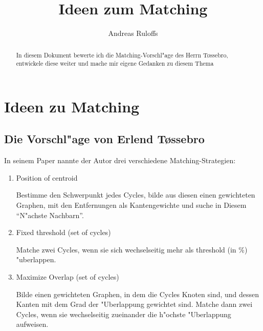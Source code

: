 \documentclass[a4paper,11pt]{scrreprt}
\title{Ideen zum Matching}
\author{Andreas Ruloffs}
\begin{document}
\maketitle

\begin{abstract}
In diesem Dokument bewerte ich die Matching-Vorschl"age des Herrn T\o{}ssebro, entwickele diese weiter und mache mir eigene Gedanken zu diesem Thema
\end{abstract}
\tableofcontents
\chapter{Ideen zu Matching}

\section{Die Vorschl"age von Erlend T\o{}ssebro}
In seinem Paper nannte der Autor drei verschiedene Matching-Strategien:
\begin{enumerate}
\item Position of centroid

Bestimme den Schwerpunkt jedes Cycles,  bilde aus diesen einen gewichteten Graphen, mit den Entfernungen als Kantengewichte und suche in Diesem "`N"achste Nachbarn"'.
\item Fixed threshold (set of cycles)

Matche zwei Cycles, wenn sie sich wechselseitig  mehr als threshold (in \%) "uberlappen.

\item Maximize Overlap (set of cycles)

Bilde einen gewichteten Graphen, in dem die Cycles Knoten sind, und dessen Kanten mit dem Grad der "Uberlappung gewichtet sind. Matche dann zwei Cycles, wenn sie wechselseitig zueinander die h"ochste "Uberlappung aufweisen.
\end{enumerate} 
\end{document}
